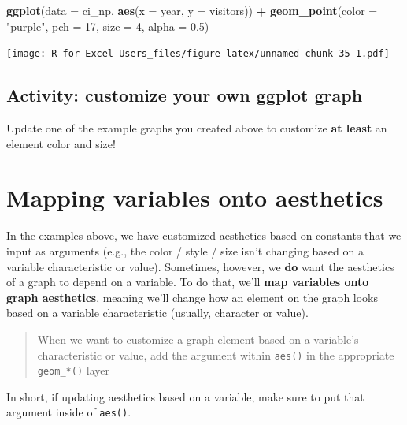\documentclass[]{book}
\newenvironment{Shaded}{\begin{snugshade}}{\end{snugshade}}
\newcommand{\DataTypeTok}[1]{\textcolor[rgb]{0.13,0.29,0.53}{#1}}
\newcommand{\DecValTok}[1]{\textcolor[rgb]{0.00,0.00,0.81}{#1}}
\newcommand{\FloatTok}[1]{\textcolor[rgb]{0.00,0.00,0.81}{#1}}
\newcommand{\KeywordTok}[1]{\textcolor[rgb]{0.13,0.29,0.53}{\textbf{#1}}}
\newcommand{\NormalTok}[1]{#1}
\newcommand{\OperatorTok}[1]{\textcolor[rgb]{0.81,0.36,0.00}{\textbf{#1}}}
\newcommand{\StringTok}[1]{\textcolor[rgb]{0.31,0.60,0.02}{#1}}
\begin{document}
\begin{Shaded}
\begin{Highlighting}[]
\KeywordTok{ggplot}\NormalTok{(}\DataTypeTok{data =}\NormalTok{ ci_np, }\KeywordTok{aes}\NormalTok{(}\DataTypeTok{x =}\NormalTok{ year, }\DataTypeTok{y =}\NormalTok{ visitors)) }\OperatorTok{+}
\StringTok{  }\KeywordTok{geom_point}\NormalTok{(}\DataTypeTok{color =} \StringTok{"purple"}\NormalTok{,}
             \DataTypeTok{pch =} \DecValTok{17}\NormalTok{,}
             \DataTypeTok{size =} \DecValTok{4}\NormalTok{,}
             \DataTypeTok{alpha =} \FloatTok{0.5}\NormalTok{)}
\end{Highlighting}
\end{Shaded}

\texttt{[image: R-for-Excel-Users\_files/figure-latex/unnamed-chunk-35-1.pdf]}

\hypertarget{activity-customize-your-own-ggplot-graph}{%
\subsection{Activity: customize your own ggplot graph}\label{activity-customize-your-own-ggplot-graph}}

Update one of the example graphs you created above to customize \textbf{at least} an element color and size!

\hypertarget{mapping-variables-onto-aesthetics}{%
\section{Mapping variables onto aesthetics}\label{mapping-variables-onto-aesthetics}}

In the examples above, we have customized aesthetics based on constants that we input as arguments (e.g., the color / style / size isn't changing based on a variable characteristic or value). Sometimes, however, we \textbf{do} want the aesthetics of a graph to depend on a variable. To do that, we'll \textbf{map variables onto graph aesthetics}, meaning we'll change how an element on the graph looks based on a variable characteristic (usually, character or value).

\begin{quote}
When we want to customize a graph element based on a variable's characteristic or value, add the argument within \texttt{aes()} in the appropriate \texttt{geom\_*()} layer
\end{quote}

In short, if updating aesthetics based on a variable, make sure to put that argument inside of \texttt{aes()}.
\end{document}
